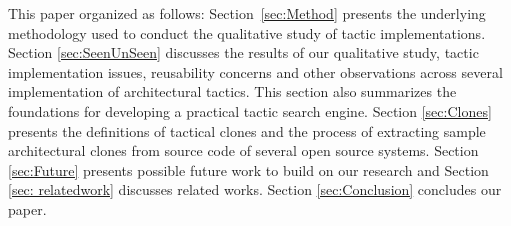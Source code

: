 This paper organized as follows: Section~\ref{sec:Method} presents the underlying methodology used to conduct the qualitative study of tactic implementations. Section \ref{sec:SeenUnSeen} discusses the results of our qualitative study, tactic implementation issues, reusability concerns and other observations across several implementation of architectural tactics. This section also summarizes the foundations for developing a practical tactic search engine. Section \ref{sec:Clones} presents the definitions of tactical clones and the process of extracting sample architectural clones from source code of several open source systems. Section \ref{sec:Future} presents possible future work to build on our research and Section \ref{sec: relatedwork} discusses related works. Section \ref{sec:Conclusion} concludes our paper. 
